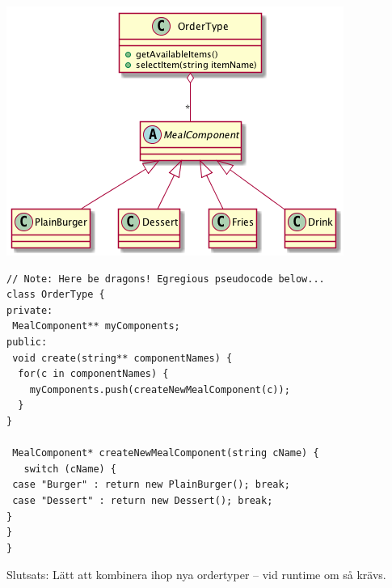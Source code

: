 \documentclass[11pt]{article}
\begin{document}
\begin{center}
\includegraphics[width=.9\linewidth]{202004-ecs.png}
\end{center}

\begin{verbatim}
// Note: Here be dragons! Egregious pseudocode below...
class OrderType {
private:
 MealComponent** myComponents;
public:
 void create(string** componentNames) {
  for(c in componentNames) {
    myComponents.push(createNewMealComponent(c));
  }
}

 MealComponent* createNewMealComponent(string cName) {
   switch (cName) {
 case "Burger" : return new PlainBurger(); break;
 case "Dessert" : return new Dessert(); break;
}
}
}
\end{verbatim}

Slutsats: Lätt att kombinera ihop nya ordertyper -- vid runtime om så krävs.
\end{document}
